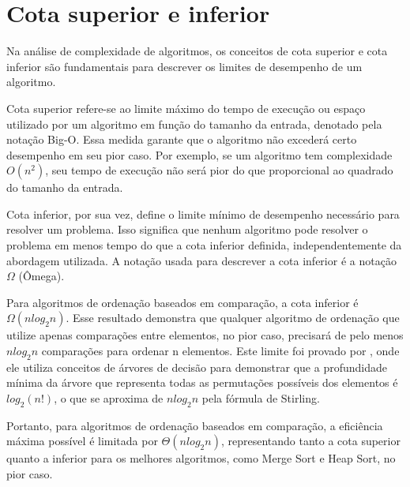 \section{Cota superior e inferior}
Na análise de complexidade de algoritmos, os conceitos de cota superior e cota inferior são fundamentais para descrever os limites de desempenho de um algoritmo.

Cota superior refere-se ao limite máximo do tempo de execução ou espaço utilizado por um algoritmo em função do tamanho da entrada, denotado pela notação Big-O. Essa medida garante que o algoritmo não excederá certo desempenho em seu pior caso. Por exemplo, se um algoritmo tem complexidade $O(n^2)$, seu tempo de execução não será pior do que proporcional ao quadrado do tamanho da entrada.

Cota inferior, por sua vez, define o limite mínimo de desempenho necessário para resolver um problema. Isso significa que nenhum algoritmo pode resolver o problema em menos tempo do que a cota inferior definida, independentemente da abordagem utilizada. A notação usada para descrever a cota inferior é a notação $\Omega$ (Ômega).

Para algoritmos de ordenação baseados em comparação, a cota inferior é $\Omega(nlog_2n)$. Esse resultado demonstra que qualquer algoritmo de ordenação que utilize apenas comparações entre elementos, no pior caso, precisará de pelo menos $nlog_2n$ comparações para ordenar n elementos. Este limite foi provado por \cite{knuth1998art}, onde ele utiliza conceitos de árvores de decisão para demonstrar que a profundidade mínima da árvore que representa todas as permutações possíveis dos elementos é $log_2(n!)$, o que se aproxima de $nlog_2n$ pela fórmula de Stirling.

Portanto, para algoritmos de ordenação baseados em comparação, a eficiência máxima possível é limitada por $\Theta(nlog_2n)$, representando tanto a cota superior quanto a inferior para os melhores algoritmos, como Merge Sort e Heap Sort, no pior caso.

